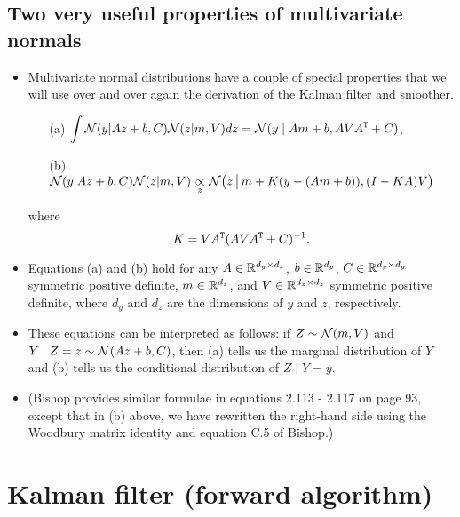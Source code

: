 \documentclass[12pt]{article}
\begin{document}
\subsection{Two very useful properties of multivariate normals}

\begin{itemize}
\item Multivariate normal distributions have a couple of special properties that we will use over and over again the derivation of the Kalman filter and smoother.
\vspace{1ex}
\begin{itemize}
\item[(a)] $\displaystyle\int \mathcal{N}(y | A z + b,C) \mathcal{N}(z | m,V) d z
= \mathcal{N}(y \mid A m + b, A V A^{\mathtt{T}} + C) $,
\vspace{2ex}
\item[(b)] $\displaystyle \mathcal{N}(y | A z + b,C) \mathcal{N}(z | m,V)
\,\mathop{\propto}_z\, \mathcal{N}\big(z \,\big\vert\, m + K(y -(A m + b)), (I - K A) V\big)$
\end{itemize}
where 
$$ K = V A^{\mathtt{T}}(A V A^{\mathtt{T}} + C)^{-1}. $$
\item Equations (a) and (b) hold for any $A\in \mathbb{R}^{d_y \times d_z}$, $b\in\mathbb{R}^{d_y}$, $C \in \mathbb{R}^{d_y \times d_y}$ symmetric positive definite, $m \in \mathbb{R}^{d_z}$, and $V \in \mathbb{R}^{d_z \times d_z}$ symmetric positive definite, where $d_y$ and $d_z$ are the dimensions of $y$ and $z$, respectively.
\item These equations can be interpreted as follows: if $Z \sim \mathcal{N}(m,V)$ and $Y \mid Z=z \sim \mathcal{N}(A z + b,C)$, then (a) tells us the marginal distribution of $Y$ and (b) tells us the conditional distribution of $Z \mid Y = y$.
\item (Bishop provides similar formulae in equations 2.113 - 2.117 on page 93, except that in (b) above, we have rewritten the right-hand side using the Woodbury matrix identity and equation C.5 of Bishop.)
\end{itemize}


\section{Kalman filter (forward algorithm)}
\end{document}
